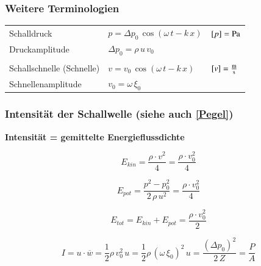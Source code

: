 \subsubsection{Weitere Terminologien}

\renewcommand{\arraystretch}{1.2}
\begin{tabular}{lll}
Schalldruck & $p = \Delta p_0 \, \cos(\omega \, t - k \, x)$ & $[p] = \mathrm{Pa}$ \\
Druckamplitude & $  \Delta p_0 = \rho \, u \, v_0 $ & \\
\\
Schallschnelle (Schnelle) & $v = v_0 \,  \cos(\omega \, t - k \, x)$ & $[v] = \frac{\mathrm{m}}{\mathrm{s}}$ \\
Schnellenamplitude & $v_0 = \omega \, \xi_0$ 
\end{tabular}
\renewcommand{\arraystretch}{1}



\subsubsection{Intensität der Schallwelle (siehe auch \ref{Pegel})}

\textbf{Intensität = gemittelte Energieflussdichte} \\

\begin{minipage}{0.48\linewidth}
$$ E_{kin} = \frac{\rho \cdot v^2}{4} = \frac{\rho \cdot v_0^2}{4} $$
\end{minipage}
\hfill
\begin{minipage}{0.48\linewidth}
$$ E_{pot} = \frac{p^2 - p_0^2}{2 \, \rho \, u^2} = \frac{\rho \cdot v_0^2}{4} $$
\end{minipage}

$$ E_{tot} = E_{kin} + E_{pot} = \frac{\rho \cdot v_0^2}{2} $$


$$ \boxed{ I = u \cdot \overline{w} = \frac{1}{2} \rho \, v_0^2 \, u  =  \frac{1}{2} \rho \, (\omega \, \xi_0)^2  \, u = \frac{( \Delta p_0)^2}{2 \, Z} = \frac{P}{A} } $$

\vspace{0.2cm}

